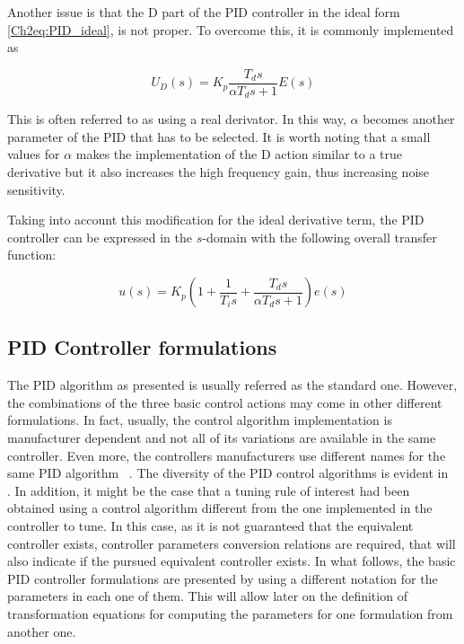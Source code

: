 Another issue is that the D part of the PID controller in the ideal form \eqref{Ch2eq:PID_ideal},  is not proper. To overcome this, it is commonly implemented as

\[U_D(s)= K_p\frac{T_ds}{\alpha T_d s+1} E(s)\]

This is often referred to as using a real derivator. In this way, $\alpha$ becomes another parameter of the PID that has to be selected. It is worth noting that a small values for $\alpha$ makes the implementation of the D action similar to a true derivative but it also increases the high frequency gain, thus increasing noise sensitivity.

Taking into account this modification for the ideal derivative term, the PID controller can be expressed in the $s$-domain with the following overall transfer function:

\begin{equation}
u(s)=K_p \left ( 1+\frac{1}{T_is}+\frac{T_ds}{\alpha T_d s+1} \right )  e(s)
\end{equation}

\subsection{PID Controller formulations}
\label{sec:3.1}
The PID algorithm as presented is usually referred as the standard one. However, the combinations of the three basic control actions may come in other different formulations. In fact, usually, the control algorithm implementation is manufacturer dependent and not all of its variations are available in the same controller. Even more, the controllers manufacturers use different names for the same PID algorithm~\citep{gerry1987} \citep{vilanova2017WEE}.  The diversity of the PID control algorithms is evident in~\citet{odwyer2006} .  In addition, it might be the case that a tuning rule of interest had been obtained using a control algorithm different from the one implemented in the controller to tune. In this case, as it is not guaranteed that the equivalent controller exists, controller parameters conversion relations are required, that will also indicate if the pursued equivalent controller exists. In what follows, the basic PID controller formulations are presented by using a different notation for the parameters in each one of them. This will allow later on the definition of transformation equations for computing the parameters for one formulation from another one.

